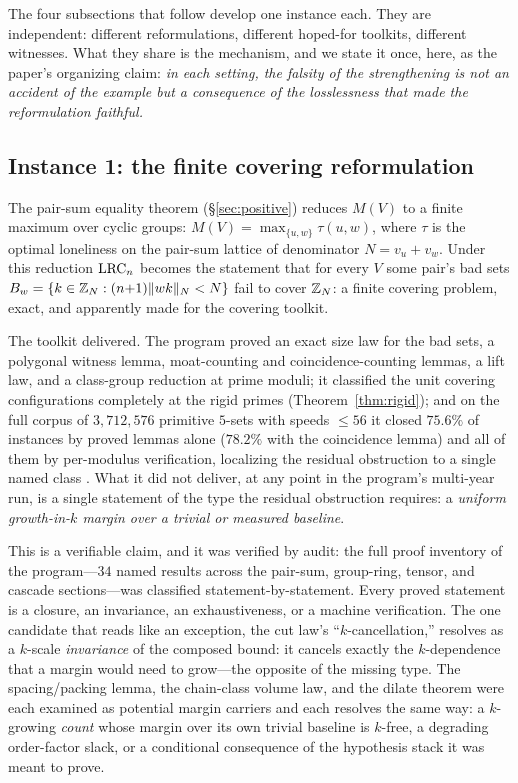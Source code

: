 The four subsections that follow develop one instance each. They are
independent: different reformulations, different hoped-for toolkits,
different witnesses. What they share is the mechanism, and we state it
once, here, as the paper's organizing claim: \emph{in each setting, the
falsity of the strengthening is not an accident of the example but a
consequence of the losslessness that made the reformulation faithful.}

\subsection{Instance 1: the finite covering reformulation}\label{sec:tm-covering}

The pair-sum equality theorem (\S\ref{sec:positive}) reduces
$M(V)$ to a finite maximum over cyclic groups: $M(V)=\max_{\{u,w\}}
\tau(u,w)$, where $\tau$ is the optimal loneliness on the pair-sum
lattice of denominator $N=v_u+v_w$. Under this reduction $\mathrm{LRC}_n$
becomes the statement that for every $V$ some pair's bad sets
$B_w=\{k\in\mathbb{Z}_N:(n{+}1)\lVert wk \rVert_{N}<N\}$ fail to cover $\mathbb{Z}_N$: a finite
covering problem, exact, and apparently made for the covering toolkit.

The toolkit delivered. The program proved an exact size law for the bad
sets, a polygonal witness lemma, moat-counting and coincidence-counting
lemmas, a lift law, and a class-group reduction at prime moduli; it
classified the unit covering configurations completely at the rigid
primes (Theorem~\ref{thm:rigid}); and on the full corpus of
$3{,}712{,}576$ primitive $5$-sets with speeds $\le 56$ it closed
$75.6\%$ of instances by proved lemmas alone ($78.2\%$ with the
coincidence lemma) and all of them by per-modulus verification,
localizing the residual obstruction to a single named class
\cite{prog-artifacts}. What it did not deliver, at any point in the
program's multi-year run, is a single statement of the type the residual
obstruction requires: a \emph{uniform growth-in-$k$ margin over a trivial
or measured baseline}.

This is a verifiable claim, and it was verified by audit: the full proof
inventory of the program---$34$ named results across the pair-sum,
group-ring, tensor, and cascade sections---was classified
statement-by-statement. Every proved statement is a closure, an
invariance, an exhaustiveness, or a machine verification. The one
candidate that reads like an exception, the cut law's
``$k$-cancellation,'' resolves as a $k$-scale \emph{invariance} of the
composed bound: it cancels exactly the $k$-dependence that a margin
would need to grow---the opposite of the missing type. The
spacing/packing lemma, the chain-class volume law, and the dilate theorem
were each examined as potential margin carriers and each resolves the
same way: a $k$-growing \emph{count} whose margin over its own trivial
baseline is $k$-free, a degrading order-factor slack, or a conditional
consequence of the hypothesis stack it was meant to prove.

